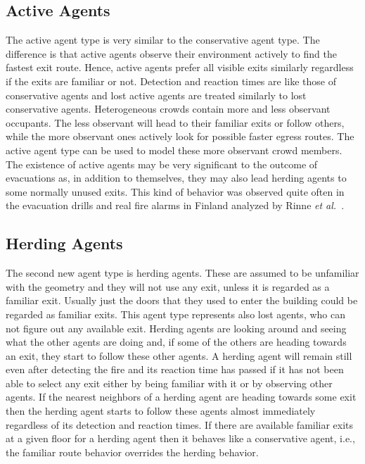 \documentclass[12pt,a4paper,final,twoside]{stylevk}
\begin{document}
\subsection{Active Agents}\label{Sec_ActiveAgents}

\noindent The active agent type is very similar to the conservative
agent type.  The difference is that active agents observe their
environment actively to find the fastest exit route.  Hence, active
agents prefer all visible exits similarly regardless if the exits are
familiar or not.  Detection and reaction times are like those of
conservative agents and lost active agents are treated similarly to
lost conservative agents.  Heterogeneous crowds contain more and less
observant occupants.  The less observant will head to their familiar
exits or follow others, while the more observant ones actively look
for possible faster egress routes.  The active agent type can be used
to model these more observant crowd members.  The existence of active
agents may be very significant to the outcome of evacuations as, in
addition to themselves, they may also lead herding agents to some
normally unused exits.  This kind of behavior was observed quite often
in the evacuation drills and real fire alarms in Finland analyzed by
Rinne \emph{et al.}~\cite{Rinne10}.


\subsection{Herding Agents}\label{Sec_HerdingAgents}

\noindent The second new agent type is herding agents.  These are
assumed to be unfamiliar with the geometry and they will not use any
exit, unless it is regarded as a familiar exit.  Usually just the
doors that they used to enter the building could be regarded as
familiar exits.  This agent type represents also lost agents, who can
not figure out any available exit.  Herding agents are looking around
and seeing what the other agents are doing and, if some of the others
are heading towards an exit, they start to follow these other agents.
A herding agent will remain still even after detecting the fire and
its reaction time has passed if it has not been able to select any
exit either by being familiar with it or by observing other agents.
If the nearest neighbors of a herding agent are heading towards some
exit then the herding agent starts to follow these agents almost
immediately regardless of its detection and reaction times.  If there
are available familiar exits at a given floor for a herding agent then
it behaves like a conservative agent, i.e., the familiar route
behavior overrides the herding behavior.
\end{document}
